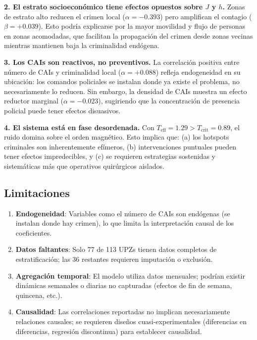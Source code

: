 \documentclass[12pt,a4paper]{article}
\begin{document}
\textbf{2. El estrato socioeconómico tiene efectos opuestos sobre $J$ y $h$.} Zonas de estrato alto reducen el crimen local ($\alpha = -0.393$) pero amplifican el contagio ($\beta = +0.039$). Esto podría explicarse por la mayor movilidad y flujo de personas en zonas acomodadas, que facilitan la propagación del crimen desde zonas vecinas mientras mantienen baja la criminalidad endógena.

\textbf{3. Los CAIs son reactivos, no preventivos.} La correlación positiva entre número de CAIs y criminalidad local ($\alpha = +0.088$) refleja endogeneidad en su ubicación: los comandos policiales se instalan donde ya existe el problema, no necesariamente lo reducen. Sin embargo, la densidad de CAIs muestra un efecto reductor marginal ($\alpha = -0.023$), sugiriendo que la concentración de presencia policial puede tener efectos disuasivos.

\textbf{4. El sistema está en fase desordenada.} Con $T_{\text{eff}} = 1.29 > T_{\text{crit}} = 0.89$, el ruido domina sobre el orden magnético. Esto implica que: (a) los hotspots criminales son inherentemente efímeros, (b) intervenciones puntuales pueden tener efectos impredecibles, y (c) se requieren estrategias sostenidas y sistemáticas más que operativos quirúrgicos aislados.

\subsection{Limitaciones}
\begin{enumerate}[label=\alph*)]
    \item \textbf{Endogeneidad}: Variables como el número de CAIs son endógenas (se instalan donde hay crimen), lo que limita la interpretación causal de los coeficientes.
    \item \textbf{Datos faltantes}: Solo 77 de 113 UPZs tienen datos completos de estratificación; las 36 restantes requieren imputación o exclusión.
    \item \textbf{Agregación temporal}: El modelo utiliza datos mensuales; podrían existir dinámicas semanales o diarias no capturadas (efectos de fin de semana, quincena, etc.).
    \item \textbf{Causalidad}: Las correlaciones reportadas no implican necesariamente relaciones causales; se requieren diseños cuasi-experimentales (diferencias en diferencias, regresión discontinua) para establecer causalidad.
\end{enumerate}
\end{document}
